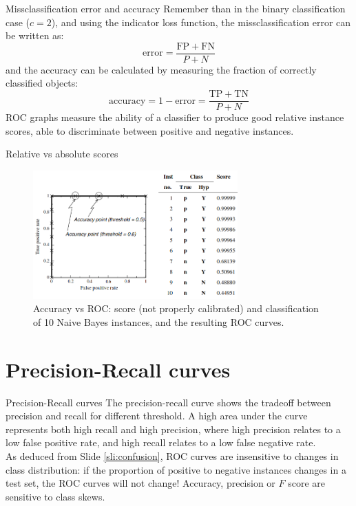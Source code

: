 \documentclass{beamer}
\begin{document}
\begin{frame}{Missclassification error and accuracy}
  Remember than in the binary classification case ($c=2$), and using the indicator loss function, the missclassification error can be written as:
  \[
    \mathrm{error} = \frac{\mathrm{FP}+\mathrm{FN}}{P+N}  
  \]
  and the accuracy can be calculated by measuring the fraction of correctly classified objects:
  \[
    \mathrm{accuracy} = 1 -   \mathrm{error} = \frac{\mathrm{TP}+\mathrm{TN}}{P+N}
  \]
  ROC graphs measure the ability of a classifier to produce good relative instance scores, able to discriminate between positive and negative instances.
\end{frame}

\begin{frame}{Relative vs absolute scores}
  \begin{figure}
    \includegraphics[width=0.7\textwidth]{ROCNaiveBayes}
    \caption{Accuracy vs ROC: score (not properly calibrated) and classification of 10 Naive Bayes instances, and the resulting ROC curves\cite{fawcettIntroductionROCAnalysis2006}.}
  \end{figure}
\end{frame}

\section{Precision-Recall curves}

\begin{frame}{Precision-Recall curves}
  The precision-recall curve shows the tradeoff between precision and recall for different threshold. A high area under the curve represents both high recall and high precision, where high precision relates to a low false positive rate, and high recall relates to a low false negative rate.  
  \\[10pt]
  As deduced from Slide \ref{sli:confusion}, ROC curves are insensitive to changes in class distribution: if the proportion of positive to negative instances changes in a test set, the ROC curves will not change! Accuracy, precision or $F$ score are sensitive to class skews.
\end{frame}
\end{document}
